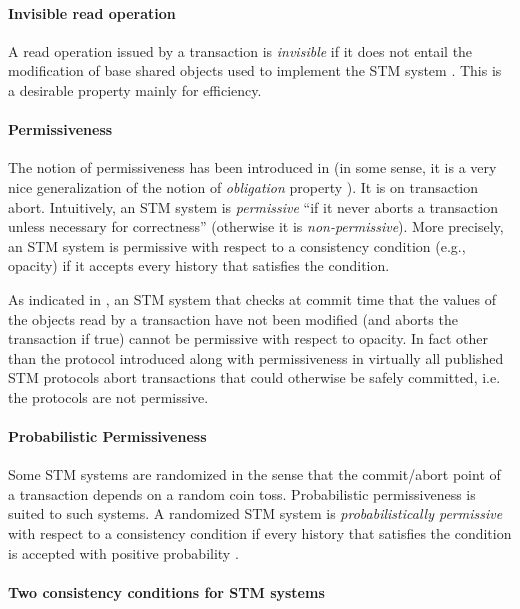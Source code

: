 \documentclass[runningheads,a4paper]{article}
\begin{document}
\paragraph{Invisible read operation}
A read operation issued by a transaction is {\it invisible} if it does 
not entail the modification of base shared objects used to implement 
the STM system  \cite{MSHAESS06}.
This is a desirable property mainly for efficiency. 


\paragraph{Permissiveness}
The  notion  of permissiveness  has been introduced in  \cite{GHS08}
(in some sense,  it is a  very  nice generalization of the notion  of  
{\it obligation} property \cite{IR09-a}). It is on  transaction abort. 
Intuitively, an STM system is {\it permissive}  ``if it  never aborts a 
transaction unless necessary for  correctness'' (otherwise it is 
{\it non-permissive}).  More precisely, 
an STM system is permissive with respect to a consistency condition 
(e.g., opacity) if  it accepts  every history that satisfies the condition. 

As indicated in \cite{GHS08}, an STM system that checks at commit time that
the values of the objects read by a transaction have not been modified (and 
aborts the transaction if true) cannot be permissive  with respect to opacity. 
In fact other than the protocol introduced along with permissiveness in \cite{GHS08}
virtually all published STM protocols abort transactions that could
otherwise be safely committed, i.e. the protocols are not permissive.


\paragraph{Probabilistic Permissiveness}
Some STM systems are randomized in the sense that the commit/abort point of
a transaction depends on  a random coin toss. Probabilistic permissiveness is
suited to  such systems. A  randomized STM system is  {\it probabilistically
permissive} with respect to a  consistency condition if every history that
satisfies the condition is accepted with positive probability \cite{GHS08}. 



\paragraph{Two consistency conditions  for STM systems}
\end{document}

